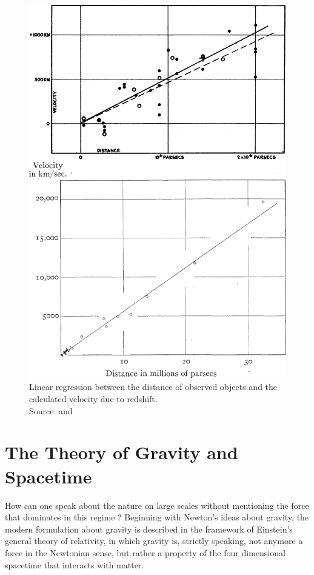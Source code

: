 \begin{figure}[H]
\begin{minipage}{8cm}
        \includegraphics[scale=0.17]{figures/images/hubble_distance-vs-velocity.png}
        \caption{Linear regression between the distance of observed objects and the calculated velocity due to redshift. \\ 
        Source: \cite{Hubble1929} and \cite[Figure 5]{Hubble1931}}
        \label{fig:hubble-law}
    \end{minipage}    
\end{figure}



\section{The Theory of Gravity and Spacetime}
How can one speak about the nature on large scales without mentioning the force that dominates in this regime ?
Beginning with Newton's ideas about gravity, the modern formulation about gravity is described in the framework of Einstein's general theory of relativity, in which gravity is, strictly speaking, not anymore a force in the Newtonian sense, but rather a property of the four dimensional spacetime that interacts with matter. \\

